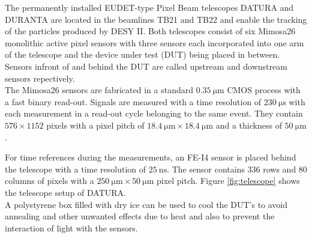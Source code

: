 The permanently installed EUDET-type Pixel Beam telescopes DATURA and DURANTA are located in the beamlines TB21 and TB22 and enable the tracking of the particles
produced by DESY II. Both telescopes consist of six Mimosa26 monolithic active pixel sensors \cite{mimosa26} with %
three sensors each incorporated into one arm of the telescope and the device under test (DUT) being placed in between. Sensors infront of and behind
the DUT are called upstream and downstream sensors repectively.\\
The Mimosa26 sensors are fabricated in a standard $\SI{0.35}{\micro\meter}$ CMOS process with a fast binary read-out.
Signals are measured with a time resolution of $\SI{230}{\micro\second}$ with each measurement in a read-out cycle belonging to the same event.
They contain $576 \times 1152$ pixels with a pixel pitch of $\SI{18.4}{\micro\meter} \times \SI{18.4}{\micro\meter}$
and a thickness of $\SI{50}{\micro\meter}$.

For time references during the measurements, an FE-I4 sensor \cite{fei4} is placed behind the telescope with a
time resolution of $\SI{25}{\nano\second}$. The sensor contains 336 rows and 80 columns of pixels with a
$\SI{250}{\micro\meter} \times \SI{50}{\micro\meter}$ pixel pitch. Figure \ref{fig:telescope} shows the telescope setup of DATURA. \\
A polystyrene box filled with dry ice can be used to cool the DUT's to
avoid annealing and other unwanted effects due to heat and also to prevent the interaction of light with the sensors.


